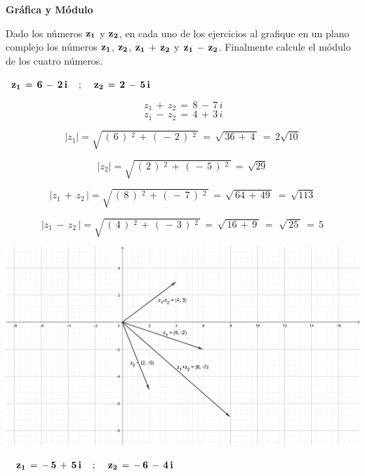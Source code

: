 \documentclass[a4paper,11pt,openany]{book}
\begin{document}
\newpage


\begin{center}
\textbf{Gráfica y Módulo}
\end{center}

Dado los números $\bf{z_{1}}$ y $\bf{z_{2}}$, en cada uno de los ejercicios  al  grafique en un plano complejo los números $\bf{z_{1}}$, $\bf{z_{2}}$, $\bf{z_{1}\,+\,z_{2}}$ y $\bf{z_{1}\,-\,z_{2}}$. Finalmente calcule el módulo de los cuatro números.\\

\providecommand{\abs}[1]{\lvert#1\rvert} 
\graphicspath{ {images/} }




\textcolor{ao(english)}{}\,\quad\,$\bf{z_{1}\,=\,6\,-\,2\,i \quad\,;\,\quad z_{2}\,=\,2\,-\,5\,i}$

$$\,{z_1}\,+\,{z_2}\,=\,8\,-\,7\,i$$
$$\,{z_1}\,-\,{z_2}\,=\,4\,+\,3\,i$$

$$\abs{z_1} = \sqrt{\,(\,6\,)\,^{\,2}\,+\,(\,-\,2\,)\,^{\,2}\,}\,=\,\sqrt{\,36\,+\,4\,}\,=\,\boxed{2\sqrt{10}}$$

$$\abs{z_2} = \sqrt{\,(\,2\,)\,^{\,2}\,+\,(\,-\,5\,)\,^{\,2}\,}\,=\,\boxed{\sqrt{29}}$$

$$\abs{z_1\,+\,{z_2}\,} = \sqrt{\,(\,8\,)\,^{\,2}\,+\,(\,-\,7\,)\,^{\,2}\,}\,=\,\sqrt{\,64\,+\,49\,}\,=\,\boxed{\sqrt{113}}$$

$$\abs{z_1\,-\,{z_2}\,} = \sqrt{\,(\,4\,)\,^{\,2}\,+\,(\,-\,3\,)\,^{\,2}\,}\,=\,\sqrt{\,16\,+\,9\,}\,=\,\,\sqrt{\,25\,}\,=\,\boxed{5}$$

\includegraphics[width=15cm]{geo1}

\
\textcolor{ao(english)}{}\,\quad\,$\bf{z_{1}\,=\,-\,5\,+\,5\,i \quad\,;\,\quad z_{2}\,=\,-\,6\,-\,4\,i}$
\end{document}

